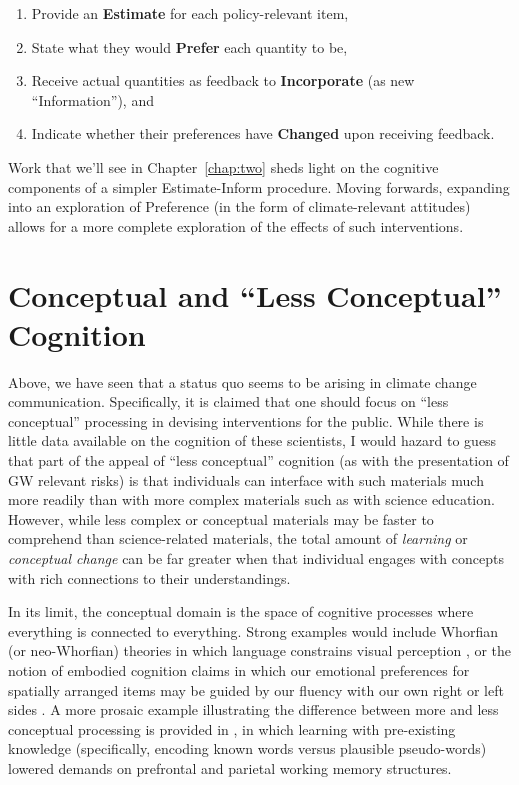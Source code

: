 \begin{enumerate}
\item Provide an \textbf{Estimate} for each policy-relevant item,
\item State what they would \textbf{Prefer} each quantity to be, 
\item Receive actual quantities as feedback to \textbf{Incorporate} (as new
``Information''), and 
\item Indicate whether their preferences have \textbf{Changed} upon receiving feedback.
\end{enumerate}

Work that we'll see in Chapter~\ref{chap:two} sheds light on the cognitive
components of a simpler Estimate-Inform procedure. Moving forwards, expanding
into an exploration of Preference (in the form of climate-relevant attitudes)
allows for a more complete exploration of the effects of such interventions.

\section{Conceptual and \texorpdfstring{``Less Conceptual''}{``Less Conceptual''} Cognition}
\label{sec:two}


Above, we have seen that a status quo seems to be arising in climate change
communication. Specifically, it is claimed that one should focus on ``less
conceptual'' processing in devising interventions for the public. While there is
little data available on the cognition of these scientists, I would hazard to
guess that part of the appeal of ``less conceptual'' cognition (as with the
presentation of GW relevant risks) is that individuals can interface with such
materials much more readily than with more complex materials such as
with science education. However, while less complex or conceptual materials
may be faster to comprehend than science-related materials, the total amount of 
\emph{learning} or \emph{conceptual change} can be far greater when that
individual engages with concepts with rich connections to their understandings.

In its limit, the conceptual domain is the space of cognitive processes where
everything is connected to everything. Strong examples would include Whorfian
(or neo-Whorfian) theories in which language constrains visual perception
\parencite{boroditsky_does_2001}, or the notion of embodied cognition claims in
which our emotional preferences for spatially arranged items may be guided by
our fluency with our own right or left sides
\parencite{casasanto_embodiment_2009}. A more prosaic example illustrating the
difference between more and less conceptual processing is provided in
\textcite{clark_assembling_2003}, in which learning with pre-existing knowledge
(specifically, encoding known words versus plausible pseudo-words) lowered demands
on prefrontal and parietal working memory structures.

